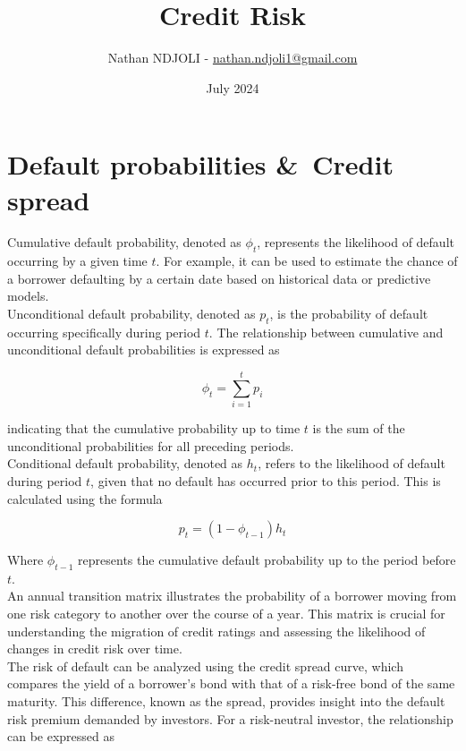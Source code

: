 \documentclass[a4paper,10pt]{article}
\title{Credit Risk}
\author{Nathan NDJOLI - \href{mailto:nathan.ndjoli1@gmail.com}{nathan.ndjoli1@gmail.com}}
\date{July 2024}
\begin{document}
\maketitle

\section{Default probabilities \&\ Credit spread}

\noindent Cumulative default probability, denoted as \( \phi_t \), represents the likelihood of default occurring by a given time \( t \). For example, it can be used to estimate the chance of a borrower defaulting by a certain date based on historical data or predictive models. \\

\noindent Unconditional default probability, denoted as \( p_t \), is the probability of default occurring specifically during period \( t \). The relationship between cumulative and unconditional default probabilities is expressed as \

\[\phi_t = \sum_{i=1}^{t} p_i\]

\noindent indicating that the cumulative probability up to time \( t \) is the sum of the unconditional probabilities for all preceding periods. \\

\noindent Conditional default probability, denoted as \( h_t \), refers to the likelihood of default during period \( t \), given that no default has occurred prior to this period. This is calculated using the formula \

\[p_t = (1 - \phi_{t-1})h_t\]

\noindent Where \( \phi_{t-1} \) represents the cumulative default probability up to the period before \( t \). \\

\noindent An annual transition matrix illustrates the probability of a borrower moving from one risk category to another over the course of a year. This matrix is crucial for understanding the migration of credit ratings and assessing the likelihood of changes in credit risk over time. \\

\noindent The risk of default can be analyzed using the credit spread curve, which compares the yield of a borrower's bond with that of a risk-free bond of the same maturity. This difference, known as the spread, provides insight into the default risk premium demanded by investors. For a risk-neutral investor, the relationship can be expressed as \
\end{document}
